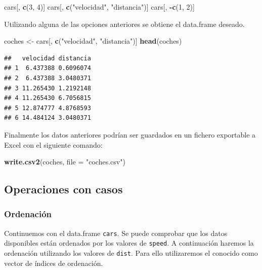 \documentclass[]{book}
\newenvironment{Shaded}{\begin{snugshade}}{\end{snugshade}}
\newcommand{\KeywordTok}[1]{\textcolor[rgb]{0.13,0.29,0.53}{\textbf{#1}}}
\newcommand{\DataTypeTok}[1]{\textcolor[rgb]{0.13,0.29,0.53}{#1}}
\newcommand{\DecValTok}[1]{\textcolor[rgb]{0.00,0.00,0.81}{#1}}
\newcommand{\StringTok}[1]{\textcolor[rgb]{0.31,0.60,0.02}{#1}}
\newcommand{\OperatorTok}[1]{\textcolor[rgb]{0.81,0.36,0.00}{\textbf{#1}}}
\newcommand{\NormalTok}[1]{#1}
\begin{document}
\begin{Shaded}
\begin{Highlighting}[]
\NormalTok{cars[, }\KeywordTok{c}\NormalTok{(}\DecValTok{3}\NormalTok{, }\DecValTok{4}\NormalTok{)]}
\NormalTok{cars[, }\KeywordTok{c}\NormalTok{(}\StringTok{"velocidad"}\NormalTok{, }\StringTok{"distancia"}\NormalTok{)]}
\NormalTok{cars[, }\OperatorTok{-}\KeywordTok{c}\NormalTok{(}\DecValTok{1}\NormalTok{, }\DecValTok{2}\NormalTok{)]}
\end{Highlighting}
\end{Shaded}

Utilizando alguna de las opciones anteriores se obtiene el data.frame
deseado.

\begin{Shaded}
\begin{Highlighting}[]
\NormalTok{coches <-}\StringTok{ }\NormalTok{cars[, }\KeywordTok{c}\NormalTok{(}\StringTok{"velocidad"}\NormalTok{, }\StringTok{"distancia"}\NormalTok{)]}
\KeywordTok{head}\NormalTok{(coches)}
\end{Highlighting}
\end{Shaded}

\begin{verbatim}
##   velocidad distancia
## 1  6.437388 0.6096074
## 2  6.437388 3.0480371
## 3 11.265430 1.2192148
## 4 11.265430 6.7056815
## 5 12.874777 4.8768593
## 6 14.484124 3.0480371
\end{verbatim}

Finalmente los datos anteriores podrían ser guardados en un fichero
exportable a Excel con el siguiente comando:

\begin{Shaded}
\begin{Highlighting}[]
\KeywordTok{write.csv2}\NormalTok{(coches, }\DataTypeTok{file =} \StringTok{"coches.csv"}\NormalTok{)}
\end{Highlighting}
\end{Shaded}

\subsection{Operaciones con casos}\label{operaciones-con-casos}

\subsubsection{Ordenación}\label{ordenacion}

Continuemos con el data.frame \texttt{cars}. Se puede comprobar que los
datos disponibles están ordenados por los valores de \texttt{speed}. A
continuación haremos la ordenación utilizando los valores de
\texttt{dist}. Para ello utilizaremos el conocido como vector de índices
de ordenación.
\end{document}
